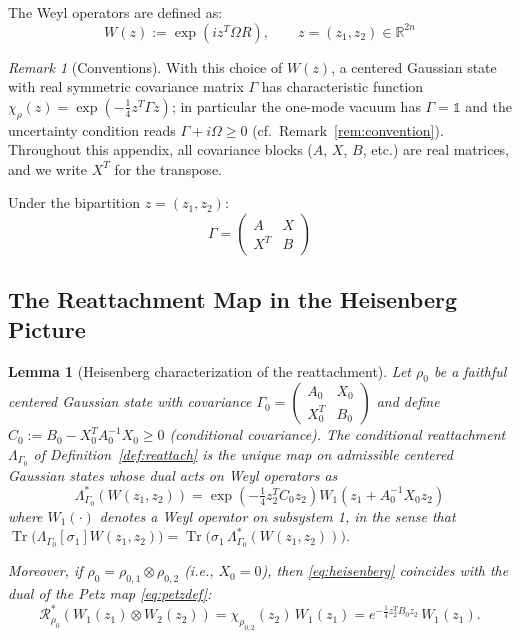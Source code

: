 \documentclass[11pt,a4paper]{article}
\newcommand{\idm}{\mathds{1}}}{\newcommand{\idm}{\mathbf{1}}}
\theoremstyle{plain}
\newtheorem{lemma}[theorem]{Lemma}
\theoremstyle{definition}
\theoremstyle{remark}
\newtheorem{remark}[theorem]{Remark}
\newcommand{\R}{\mathbb{R}}
\newcommand{\Tr}{\operatorname{Tr}}
\begin{document}
The Weyl operators are defined as:
\begin{equation}
W(z) := \exp(i z^T \Omega R), \qquad z = (z_1, z_2) \in \R^{2n}
\end{equation}

\begin{remark}[Conventions]\label{rem:appconv}
With this choice of $W(z)$, a centered Gaussian state with real symmetric
covariance matrix $\Gamma$ has characteristic function
$\chi_\rho(z) = \exp(-\tfrac{1}{4}z^T\Gamma z)$; in particular the one-mode vacuum
has $\Gamma = \idm$ and the uncertainty condition reads
$\Gamma + i\Omega \ge 0$ (cf.\ Remark~\ref{rem:convention}). Throughout this
appendix, all covariance blocks ($A$, $X$, $B$, etc.) are real matrices, and we
write $X^T$ for the transpose.
\end{remark}

Under the bipartition $z = (z_1, z_2)$:
\begin{equation}
\Gamma = \begin{pmatrix} A & X \\ X^T & B \end{pmatrix}
\end{equation}

\subsection{The Reattachment Map in the Heisenberg Picture}

\begin{lemma}[Heisenberg characterization of the reattachment]\label{lem:heisenberg}
Let $\rho_0$ be a faithful centered Gaussian state with covariance
$\Gamma_0 = \begin{pmatrix} A_0 & X_0 \\ X_0^T & B_0 \end{pmatrix}$ and define
$C_0 := B_0 - X_0^T A_0^{-1} X_0 \ge 0$ (conditional covariance). The conditional
reattachment $\Lambda_{\Gamma_0}$ of Definition~\ref{def:reattach} is the unique
map on admissible centered Gaussian states whose dual acts on Weyl operators as
\begin{equation}\label{eq:heisenberg}
\Lambda_{\Gamma_0}^*(W(z_1, z_2)) =
\exp\left(-\tfrac{1}{4} z_2^T C_0 z_2\right)
W_1\!\left(z_1 + A_0^{-1} X_0 z_2\right)
\end{equation}
where $W_1(\cdot)$ denotes a Weyl operator on subsystem 1, in the sense that
$\Tr\big(\Lambda_{\Gamma_0}[\sigma_1] W(z_1,z_2)\big) =
\Tr\big(\sigma_1\, \Lambda_{\Gamma_0}^*(W(z_1,z_2))\big)$.

Moreover, if $\rho_0 = \rho_{0,1}\otimes\rho_{0,2}$ (i.e., $X_0 = 0$), then
\eqref{eq:heisenberg} coincides with the dual of the Petz map
\eqref{eq:petzdef}:
\begin{equation}\label{eq:petzdualfact}
\mathcal{R}_{\rho_0}^*(W_1(z_1)\otimes W_2(z_2)) = \chi_{\rho_{0,2}}(z_2)\,
W_1(z_1) = e^{-\frac{1}{4}z_2^T B_0 z_2}\, W_1(z_1).
\end{equation}
\end{lemma}
\end{document}
